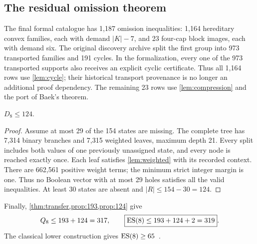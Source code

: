 \subsection{The residual omission theorem}
The final formal catalogue has 1,187 omission inequalities:
1,164 hereditary convex families, each with demand $|K|-7$, and
23 four-cap block images, each with demand six. The original discovery
archive split the first group into 973 transported families and 191
cycles. In the formalization, every one of the 973 transported supports
also receives an explicit cyclic certificate. Thus all 1,164 rows use
\cref{lem:cycle}; their historical transport provenance is no longer
an additional proof dependency. The remaining 23 rows use
\cref{lem:compression} and the port of Baek's theorem.

\begin{proposition}\label{prop:124}
$D_8\le124$.
\end{proposition}
\begin{proof}
Assume at most 29 of the 154 states are missing. The complete tree has
7,314 binary branches and 7,315 weighted leaves, maximum depth 21.
Every split includes both values of one previously unassigned state,
and every node is reached exactly once. Each leaf satisfies
\cref{lem:weighted} with its recorded context. There are 662,561
positive weight terms; the minimum strict integer margin is one.
Thus no Boolean vector with at most 29 holes satisfies all the valid
inequalities. At least 30 states are absent and $|R|\le154-30=124$.
\end{proof}

Finally, \cref{thm:transfer,prop:193,prop:124} give
\[
 Q_8\le193+124=317,\qquad
 \boxed{\operatorname{ES}(8)\le193+124+2=319}.
\]
The classical lower construction gives $\operatorname{ES}(8)\ge65$~\cite{ES61}.
